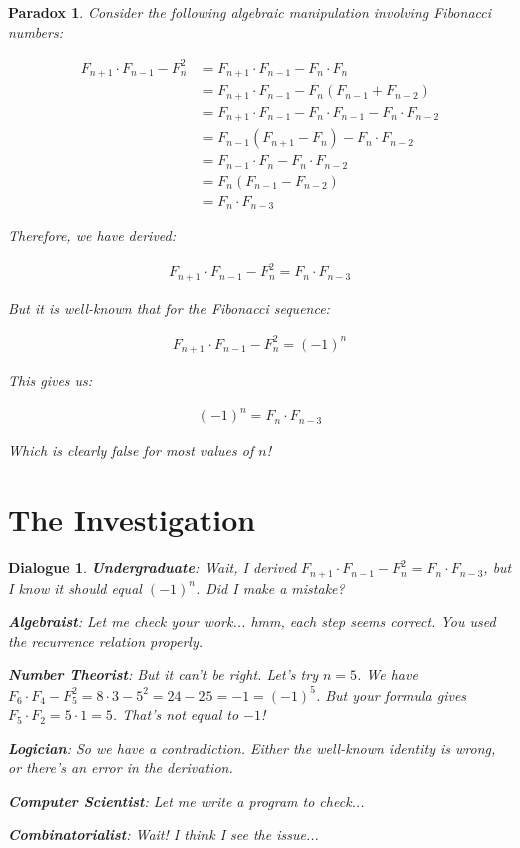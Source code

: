 \documentclass{article}
\newtheorem{paradox}{Paradox}
\newtheorem{dialogue}{Dialogue}
\begin{document}
\begin{paradox}
    Consider the following algebraic manipulation involving Fibonacci numbers:
    
    \begin{align}
        F_{n+1} \cdot F_{n-1} - F_n^2 &= F_{n+1} \cdot F_{n-1} - F_n \cdot F_n\\
        &= F_{n+1} \cdot F_{n-1} - F_n(F_{n-1} + F_{n-2})\\
        &= F_{n+1} \cdot F_{n-1} - F_n \cdot F_{n-1} - F_n \cdot F_{n-2}\\
        &= F_{n-1}(F_{n+1} - F_n) - F_n \cdot F_{n-2}\\
        &= F_{n-1} \cdot F_n - F_n \cdot F_{n-2}\\
        &= F_n(F_{n-1} - F_{n-2})\\
        &= F_n \cdot F_{n-3}
    \end{align}
    
    Therefore, we have derived:
    
    \begin{align}
        F_{n+1} \cdot F_{n-1} - F_n^2 = F_n \cdot F_{n-3}
    \end{align}
    
    But it is well-known that for the Fibonacci sequence:
    
    \begin{align}
        F_{n+1} \cdot F_{n-1} - F_n^2 = (-1)^n
    \end{align}
    
    This gives us:
    
    \begin{align}
        (-1)^n = F_n \cdot F_{n-3}
    \end{align}
    
    Which is clearly false for most values of $n$!
\end{paradox}

\section{The Investigation}

\begin{dialogue}
    \textbf{Undergraduate}: Wait, I derived $F_{n+1} \cdot F_{n-1} - F_n^2 = F_n \cdot F_{n-3}$, but I know it should equal $(-1)^n$. Did I make a mistake?
    
    \textbf{Algebraist}: Let me check your work... hmm, each step seems correct. You used the recurrence relation properly.
    
    \textbf{Number Theorist}: But it can't be right. Let's try $n=5$. We have $F_6 \cdot F_4 - F_5^2 = 8 \cdot 3 - 5^2 = 24 - 25 = -1 = (-1)^5$. But your formula gives $F_5 \cdot F_2 = 5 \cdot 1 = 5$. That's not equal to $-1$!
    
    \textbf{Logician}: So we have a contradiction. Either the well-known identity is wrong, or there's an error in the derivation.
    
    \textbf{Computer Scientist}: Let me write a program to check...
    
    \textbf{Combinatorialist}: Wait! I think I see the issue...
\end{dialogue}
\end{document}
